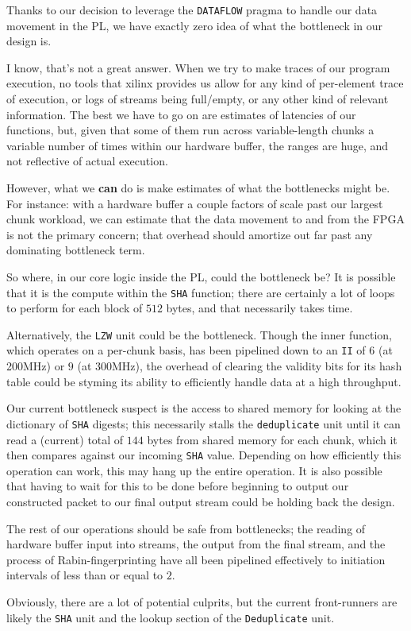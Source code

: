 \documentclass{article}
\begin{document}
Thanks to our decision to leverage the \texttt{DATAFLOW} pragma to handle our data movement in the PL, we have exactly zero idea of what the bottleneck in our design is.
\par
I know, that's not a great answer. When we try to make traces of our program execution, no tools that xilinx provides us allow for any kind of per-element trace of execution, or logs of streams being full/empty, or any other kind of relevant information. The best we have to go on are estimates of latencies of our functions, but, given that some of them run across variable-length chunks a variable number of times within our hardware buffer, the ranges are huge, and not reflective of actual execution.
\newline\par
However, what we \textbf{can} do is make estimates of what the bottlenecks might be. For instance: with a hardware buffer a couple factors of scale past our largest chunk workload, we can estimate that the data movement to and from the FPGA is not the primary concern; that overhead should amortize out far past any dominating bottleneck term.
\newline\par
So where, in our core logic inside the PL, could the bottleneck be? It is possible that it is the compute within the \texttt{SHA} function; there are certainly a lot of loops to perform for each block of $512$ bytes, and that necessarily takes time.
\par
Alternatively, the \texttt{LZW} unit could be the bottleneck. Though the inner function, which operates on a per-chunk basis, has been pipelined down to an \texttt{II} of $6$ (at 200MHz) or $9$ (at 300MHz), the overhead of clearing the validity bits for its hash table could be styming its ability to efficiently handle data at a high throughput.
\par
Our current bottleneck suspect is the access to shared memory for looking at the dictionary of \texttt{SHA} digests; this necessarily stalls the \texttt{deduplicate} unit until it can read a (current) total of $144$ bytes from shared memory for each chunk, which it then compares against our incoming \texttt{SHA} value. Depending on how efficiently this operation can work, this may hang up the entire operation. It is also possible that having to wait for this to be done before beginning to output our constructed packet to our final output stream could be holding back the design.
\par
The rest of our operations should be safe from bottlenecks; the reading of hardware buffer input into streams, the output from the final stream, and the process of Rabin-fingerprinting have all been pipelined effectively to initiation intervals of less than or equal to $2$.
\newline\par
Obviously, there are a lot of potential culprits, but the current front-runners are likely the \texttt{SHA} unit and the lookup section of the \texttt{Deduplicate} unit.
\end{document}
